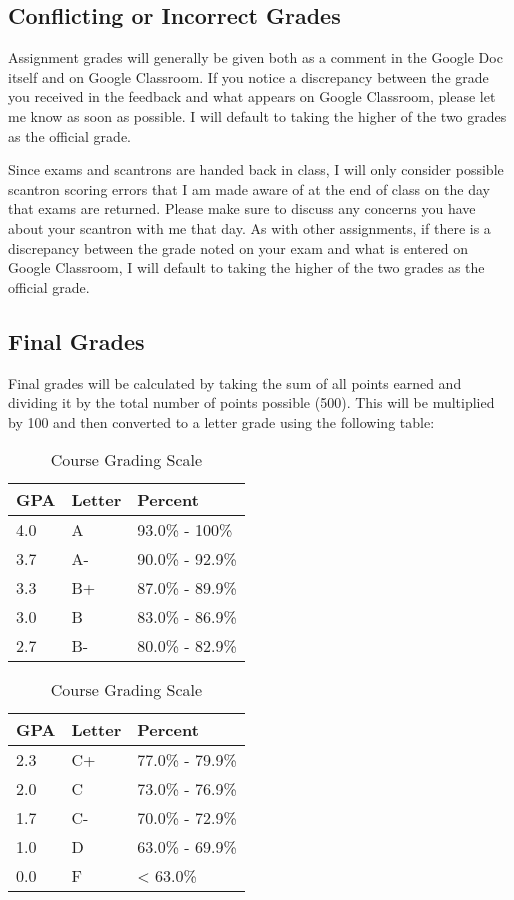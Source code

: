 \documentclass[]{book}
\begin{document}
\hypertarget{conflicting-or-incorrect-grades}{%
\subsection{Conflicting or Incorrect Grades}\label{conflicting-or-incorrect-grades}}

Assignment grades will generally be given both as a comment in the Google Doc itself and on Google Classroom. If you notice a discrepancy between the grade you received in the feedback and what appears on Google Classroom, please let me know as soon as possible. I will default to taking the higher of the two grades as the official grade.

Since exams and scantrons are handed back in class, I will only consider possible scantron scoring errors that I am made aware of at the end of class on the day that exams are returned. Please make sure to discuss any concerns you have about your scantron with me that day. As with other assignments, if there is a discrepancy between the grade noted on your exam and what is entered on Google Classroom, I will default to taking the higher of the two grades as the official grade.

\hypertarget{final-grades}{%
\subsection{Final Grades}\label{final-grades}}

Final grades will be calculated by taking the sum of all points earned and dividing it by the total number of points possible (500). This will be multiplied by 100 and then converted to a letter grade using the
following table:

\begin{table}
\caption{\label{tab:unnamed-chunk-8}Course Grading Scale}

\centering
\begin{tabular}{lll}
\toprule
GPA & Letter & Percent\\
\midrule
4.0 & A & 93.0\% - 100\%\\
3.7 & A- & 90.0\% - 92.9\%\\
3.3 & B+ & 87.0\% - 89.9\%\\
3.0 & B & 83.0\% - 86.9\%\\
2.7 & B- & 80.0\% - 82.9\%\\
\bottomrule
\end{tabular}
\centering
\begin{tabular}{lll}
\toprule
GPA & Letter & Percent\\
\midrule
2.3 & C+ & 77.0\% - 79.9\%\\
2.0 & C & 73.0\% - 76.9\%\\
1.7 & C- & 70.0\% - 72.9\%\\
1.0 & D & 63.0\% - 69.9\%\\
0.0 & F & < 63.0\%\\
\bottomrule
\end{tabular}
\end{table}
\end{document}
